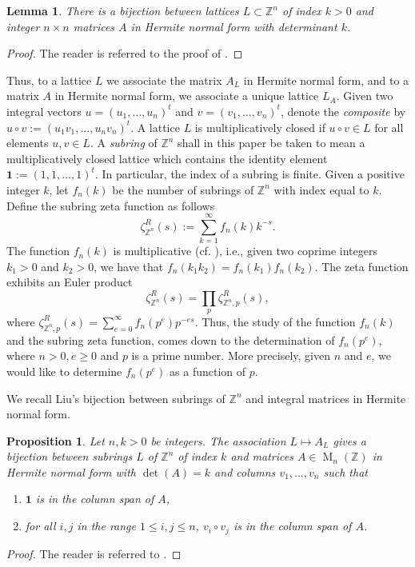 \documentclass[a4paper]{amsart}
\newtheorem{lemma}[theorem]{Lemma}
\newtheorem{proposition}[theorem]{Proposition}
\numberwithin{equation}{section}
\theoremstyle{remark}
\newcommand{\Z}{\mathbb{Z}}
\newcommand{\op}[1]{\operatorname{#1}}
\begin{document}
	\begin{lemma}
	There is a bijection between lattices $L\subset \Z^n$ of index $k>0$ and integer $n\times n$ matrices $A$ in Hermite normal form with determinant $k$.
	\end{lemma}
\begin{proof}
The reader is referred to the proof of \cite[Proposition 2.1]{liu2007counting}.
\end{proof}
Thus, to a lattice $L$ we associate the matrix $A_L$ in Hermite normal form, and to a matrix $A$ in Hermite normal form, we associate a unique lattice $L_A$. 
Given two integral vectors $u=(u_1, \dots, u_n)^t$ and $v=(v_1, \dots, v_n)^t$, denote the \emph{composite} by $u\circ v:=(u_1 v_1, \dots, u_n v_n)^t$. A lattice $L$ is multiplicatively closed if $u\circ v\in L$ for all elements $u,v\in L$. A \emph{subring} of $\Z^n$ shall in this paper be taken to mean a multiplicatively closed lattice which contains the identity element $\mathbf{1}:=(1,1,\dots, 1)^t$. In particular, the index of a subring is finite. Given a positive integer $k$, let $f_n(k)$ be the number of subrings of $\Z^n$ with index equal to $k$. Define the subring zeta function as follows
\[\zeta_{\Z^n}^R(s):=\sum_{k=1}^\infty f_n(k) k^{-s}.\] The function $f_n(k)$ is multiplicative (cf. \cite[Proposition 2.7]{liu2007counting}), i.e., given two coprime integers $k_1>0$ and $k_2>0$, we have that $f_n(k_1 k_2)=f_n(k_1) f_n(k_2)$. The zeta function exhibits an Euler product 
\[\zeta_{\Z^n}^R(s)=\prod_{p}\zeta_{\Z^n,p}^R(s),\] where $\zeta_{\Z^n,p}^R(s)=\sum_{e=0}^\infty f_n(p^e)p^{-es}$. Thus, the study of the function $f_n(k)$ and the subring zeta function, comes down to the determination of $f_n(p^e)$, where $n>0, e\geq 0$ and $p$ is a prime number. More precisely, given $n$ and $e$, we would like to determine $f_n(p^e)$ as a function of $p$. 

\par We recall Liu's bijection between subrings of $\Z^n$ and integral matrices in Hermite normal form. 
\begin{proposition}\label{liu matrices}
Let $n, k>0$ be integers. The association $L\mapsto A_L$ gives a bijection between subrings $L$ of $\Z^n$ of index $k$ and matrices $A\in \op{M}_n(\Z)$ in Hermite normal form with $\det(A) = k$ and columns $v_1, \dots, v_n$ such that 
\begin{enumerate}
    \item $\mathbf{1}$ is in the column span of $A$,
    \item for all $i,j$ in the range $1\leq i, j\leq n$, $v_i\circ v_j$ is in the column span of $A$.
\end{enumerate}
\end{proposition}
\begin{proof}
The reader is referred to \cite[Proposition 2.1, 2.2]{liu2007counting}.
\end{proof}
\end{document}
